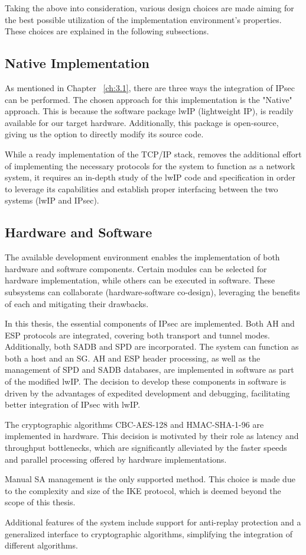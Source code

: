 Taking the above into consideration, various design choices are made aiming for the best possible utilization of the implementation environment's properties. These choices are explained in the following subsections.


\subsection{Native Implementation}

As mentioned in Chapter ~\ref{ch:3.1}, there are three ways the integration of IPsec can be performed. The chosen approach for this implementation is the "Native" approach. This is because the software package lwIP (lightweight IP), is readily available for our target hardware. Additionally, this package is open-source, giving us the option to directly modify its source code.

While a ready implementation of the TCP/IP stack, removes the additional effort of implementing the necessary protocols for the system to function as a network system, it requires an in-depth study of the lwIP code and specification in order to leverage its capabilities and establish proper interfacing between the two systems (lwIP and IPsec).


\subsection{Hardware and Software}\label{ch:4.2.2}

The available development environment enables the implementation of both hardware and software components. Certain modules can be selected for hardware implementation, while others can be executed in software. These subsystems can collaborate (hardware-software co-design), leveraging the benefits of each and mitigating their drawbacks.

In this thesis, the essential components of IPsec are implemented. Both AH and ESP protocols are integrated, covering both transport and tunnel modes. Additionally, both SADB and SPD are incorporated. The system can function as both a host and an SG. AH and ESP header processing, as well as the management of SPD and SADB databases, are implemented in software as part of the modified lwIP. The decision to develop these components in software is driven by the advantages of expedited development and debugging, facilitating better integration of IPsec with lwIP.

The cryptographic algorithms CBC-AES-128 and HMAC-SHA-1-96 are implemented in hardware. This decision is motivated by their role as latency and throughput bottlenecks, which are significantly alleviated by the faster speeds and parallel processing offered by hardware implementations.

Manual SA management is the only supported method. This choice is made due to the complexity and size of the IKE protocol, which is deemed beyond the scope of this thesis.

Additional features of the system include support for anti-replay protection and a generalized interface to cryptographic algorithms, simplifying the integration of different algorithms.
